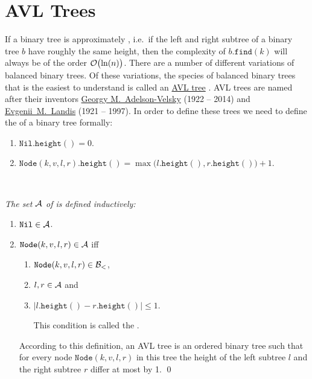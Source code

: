 \section{AVL Trees}
If a binary tree is approximately , i.e.~if the left and right subtree of a binary tree $b$  have
roughly the same height, then the complexity of $b.\mathtt{find}(k)$ will always be of the order
$\mathcal{O}\bigl(\ln(n)\bigr)$.  There are a number of different variations of
balanced binary trees.  Of these variations, the species of balanced binary trees that is the easiest to understand is
called an \href{https://en.wikipedia.org/wiki/AVL_tree}{AVL tree} \cite{adelson:62}.  AVL trees are 
named after their inventors \href{https://en.wikipedia.org/wiki/Georgy_Adelson-Velsky}{Georgy M.~Adelson-Velsky} 
(1922 -- 2014) and \href{https://en.wikipedia.org/wiki/Evgenii_Landis}{Evgenii~M.~Landis} (1921 -- 1997).  
In order to define these trees we need to define the  of a binary tree formally:
\begin{enumerate}
\item $\mathtt{Nil}.\mathtt{height}() = 0$.
\item $\mathtt{Node}(k,v,l,r).\mathtt{height}() = 
       \max\bigl( l.\mathtt{height}(), r.\mathtt{height}() \bigr) + 1$. \eox
\end{enumerate}

\begin{Definition} \hspace*{\fill} \\
{\em 
  The set $\mathcal{A}$ of  is defined inductively:
  \begin{enumerate}
  \item $\mathtt{Nil} \in \mathcal{A}$.
  \item $\mathtt{Node}(k,v,l,r) \in \mathcal{A}$ \quad iff 
        \begin{enumerate}
        \item $\mathtt{Node}(k,v,l,r) \in \mathcal{B}_<$,
        \item $l, r \in \mathcal{A}$ \quad and
        \item $|l.\mathtt{height}() - r.\mathtt{height}()| \leq 1$.

              This condition is called the .
        \end{enumerate}
        According to this definition, an AVL tree is an ordered binary tree such that for every node
        $\mathtt{Node}(k,v,l,r)$ in this tree the height of the left subtree $l$ and the right
        subtree  $r$ differ at most by 1.  \qed
  \end{enumerate}
}  
\end{Definition}

